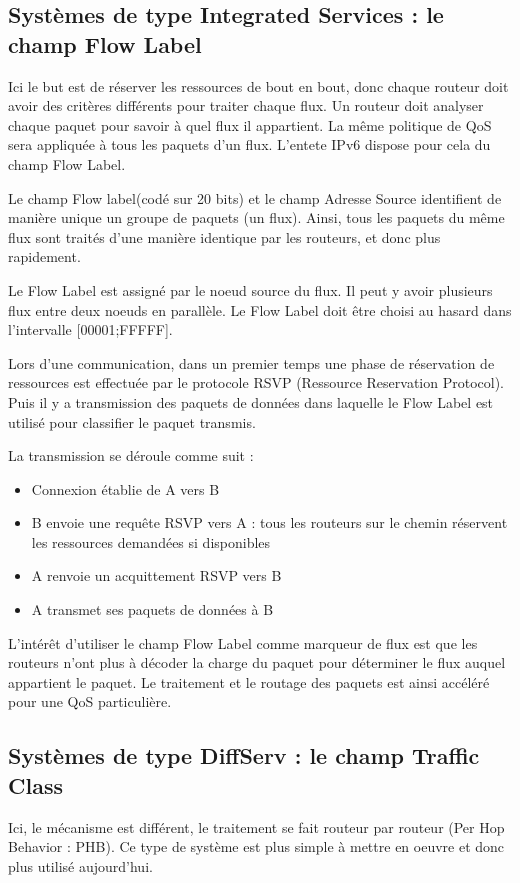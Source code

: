 \subsection{Systèmes de type Integrated Services : le champ Flow Label}
Ici le but est de réserver les ressources de bout en bout, donc chaque routeur doit avoir des critères différents pour traiter chaque flux. Un routeur doit analyser chaque paquet pour savoir à quel flux il appartient. La même politique de QoS sera appliquée à tous les paquets d'un flux. L'entete IPv6 dispose pour cela du champ Flow Label.

    Le champ Flow label(codé sur 20 bits) et le champ Adresse Source identifient de manière unique un groupe de paquets (un flux). Ainsi, tous les paquets du même flux sont traités d'une manière identique par les routeurs, et donc plus rapidement.  
    
    Le Flow Label est assigné par le noeud source du flux. Il peut y avoir plusieurs flux entre deux noeuds en parallèle. Le Flow Label doit être choisi au hasard dans l'intervalle [00001;FFFFF].
    
    Lors d'une communication, dans un premier temps une phase de réservation de ressources est effectuée par le protocole RSVP (Ressource Reservation Protocol). Puis il y a transmission des paquets de données dans laquelle le Flow Label est utilisé pour classifier le paquet transmis.
    
    La transmission se déroule comme suit : 
    \begin{itemize}
    \item Connexion établie de A vers B
    \item B envoie une requête RSVP vers A : tous les routeurs sur le chemin réservent les ressources demandées si disponibles
    \item A renvoie un acquittement RSVP vers B
    \item A transmet ses paquets de données à B
    \end{itemize}

	L'intérêt d'utiliser le champ Flow Label comme marqueur de flux est que les routeurs n'ont plus à décoder la charge du paquet pour déterminer le flux auquel appartient le paquet. Le traitement et le routage des paquets est ainsi accéléré pour une QoS particulière.
    
\subsection{Systèmes de type DiffServ : le champ Traffic Class}
	\label{diffserv}
	Ici, le mécanisme est différent, le traitement se fait routeur par routeur (Per Hop Behavior : PHB). Ce type de système est plus simple à mettre en oeuvre et donc plus utilisé aujourd'hui.
    

